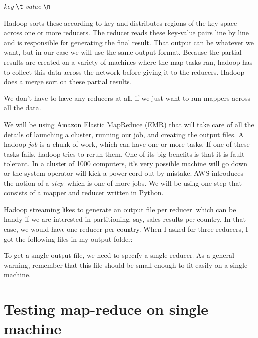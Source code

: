 \begin{fullwidth}
{\em key} \verb+\t+ {\em value} \verb+\n+

Hadoop sorts these according to key and distributes regions of the key space across one or more reducers. The reducer  reads these key-value pairs line by line and is responsible for generating the final result.  That output can be whatever we want, but in our case we will use the same output format. Because the partial results are created on a variety of machines where the map tasks ran, hadoop has to collect this data across the network before giving it to the reducers. Hadoop does a merge sort on these partial results.

We don't have to have any reducers at all, if we just want to run mappers across all the data.

We will be using Amazon Elastic MapReduce (EMR) that will take care of all the details of launching a cluster, running our job, and creating the output files.  A hadoop {\em job} is a chunk of work, which can have one or more tasks. If one of these tasks fails, hadoop tries to rerun them.  One of its big benefits is that it is fault-tolerant. In a cluster of 1000 computers, it's very possible machine will go down or the system operator will kick a power cord out by mistake. AWS introduces the notion of a {\em step}, which is one of more jobs. We will be using one step that consists of a mapper and reducer written in Python.

Hadoop streaming likes to generate an output file per reducer, which can be handy if we are interested in partitioning, say, sales results per country. In that case, we would have one reducer per country.  When I asked for three reducers, I got the following files in my output folder:


To get a single output file, we need to specify a single reducer. As a general warning, remember that this file should be small enough to fit easily on a single machine.

\section{Testing map-reduce on single machine}


\end{fullwidth}
